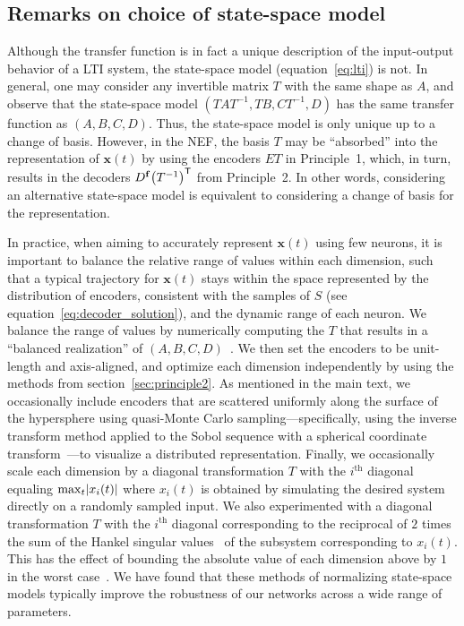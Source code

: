 \documentclass[12pt]{article}
\theoremstyle{definition}
\renewcommand{\vec}{\mathbf}  %
\newcommand{\transpose}[1]{{#1}^\mathsf{T}}
\let\originalleft\left
\let\originalright\right
\renewcommand{\left}{\mathopen{}\mathclose\bgroup\originalleft}
\renewcommand{\right}{\aftergroup\egroup\originalright}
\begin{document}
\subsection{Remarks on choice of state-space model}
\label{app:state-space}

Although the transfer function is in fact a unique description of the input-output behavior of a LTI system, the state-space model (equation~\ref{eq:lti}) is not.
In general, one may consider any invertible matrix $T$ with the same shape as $A$, and observe that the state-space model $(TAT^{-1}\text{,}\, TB\text{,}\, CT^{-1}\text{,}\, D)$ has the same transfer function as $(A\text{,}\, B\text{,}\, C\text{,}\, D)$.
Thus, the state-space model is only unique up to a change of basis.
However, in the NEF, the basis $T$ may be ``absorbed'' into the representation of $\vec{x}(t)$ by using the encoders $ET$ in Principle~1, which, in turn, results in the decoders $D^\vec{f} \transpose{\left(T^{-1}\right)}$ from Principle~2.
In other words, considering an alternative state-space model is equivalent to considering a change of basis for the representation.

In practice, when aiming to accurately represent $\vec{x}(t)$ using few neurons, it is important to balance the relative range of values within each dimension, such that a typical trajectory for $\vec{x}(t)$ stays within the space represented by the distribution of encoders, consistent with the samples of $S$ (see equation~\ref{eq:decoder_solution}), and the dynamic range of each neuron.
We balance the range of values by numerically computing the $T$ that results in a ``balanced realization'' of $(A\text{,}\, B\text{,}\, C\text{,}\, D)$~\citep{laub1987computation, perevapproximation}.
We then set the encoders to be unit-length and axis-aligned, and optimize each dimension independently by using the methods from section~\ref{sec:principle2}.
As mentioned in the main text, we occasionally include encoders that are scattered uniformly along the surface of the hypersphere using quasi-Monte Carlo sampling---specifically, using the inverse transform method applied to the Sobol sequence with a spherical coordinate transform~\citep{fang1994, voelker2016b}---to visualize a distributed representation.
Finally, we occasionally scale each dimension by a diagonal transformation $T$ with the $i^{\text{th}}$ diagonal equaling $\max_t \left| x_i(t) \right|$ where $x_i(t)$ is obtained by simulating the desired system directly on a randomly sampled input.
We also experimented with a diagonal transformation $T$ with the $i^{\text{th}}$ diagonal corresponding to the reciprocal of $2$ times the sum of the Hankel singular values~\citep{glover1987bounds} of the subsystem corresponding to $x_i(t)$.
This has the effect of bounding the absolute value of each dimension above by $1$ in the worst case~\citep{khaisongkram2007computing}.
We have found that these methods of normalizing state-space models typically improve the robustness of our networks across a wide range of parameters.
\end{document}
